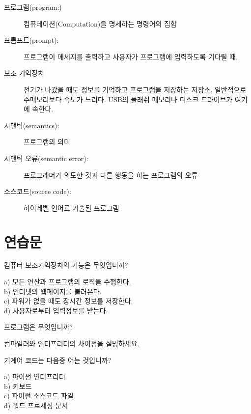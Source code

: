 \begin{description}
\item[프로그램(program:)] 컴퓨테이션(Computation)을 명세하는 명령어의 집합

\item[프롬프트(prompt):] 프로그램이 메세지를 출력하고 사용자가 프로그램에 입력하도록 기다릴 때.

\item[보조 기억장치] 전기가 나갔을 때도 정보를 기억하고 프로그램을 저장하는 저장소. 일반적으로 주메모리보다 속도가 느리다. USB의 플래쉬 메모리나 디스크 드라이브가 여기에 속한다.

\item[시맨틱(semantics):]  프로그램의 의미

\item[시맨틱 오류(semantic error):]  프로그래머가 의도한 것과 다른 행동을 하는 프로그램의 오류

\item[소스코드(source code):]  하이레벨 언어로 기술된 프로그램

\end{description}

\section{연습문}


\begin{ex}
컴퓨터 보조기억장치의 기능은 무엇입니까?

a) 모든 연산과 프로그램의 로직을 수행한다.\\
b) 인터넷의 웹페이지를 불러온다.\\
c) 파워가 없을 때도 장시간 정보를 저장한다.\\
d) 사용자로부터 입력정보를 받는다.
\end{ex}

\begin{ex}
프로그램은 무엇입니까?
\end{ex}

\begin{ex}
컴파일러와 인터프리터의 차이점을 설명하세요.
\end{ex}

\begin{ex}
기계어 코드는 다음중 어는 것입니까?

a) 파이썬 인터프리터\\
b) 키보드\\
c) 파이썬 소스코드 파일\\
d) 워드 프로세싱 문서
\end{ex}

